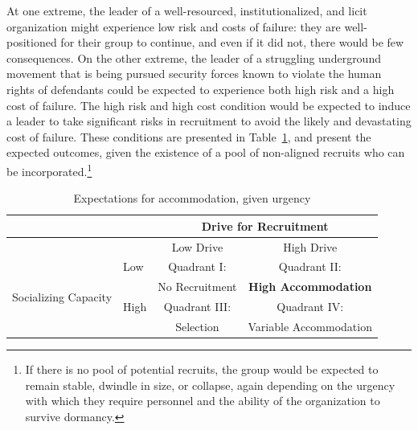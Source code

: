 At one extreme, the leader of a well-resourced, institutionalized, and licit organization might experience low risk and costs of failure: they are well-positioned for their group to continue, and even if it did not, there would be few consequences. On the other extreme, the leader of a struggling underground movement that is being pursued security forces known to violate the human rights of defendants could be expected to experience both high risk and a high cost of failure. The high risk and high cost condition would be expected to induce a leader to take significant risks in recruitment to avoid the likely and devastating cost of failure. These conditions are presented in Table~\ref{tab:preds2}, and present the expected outcomes, given the existence of a pool of non-aligned recruits who can be incorporated.\footnote{If there is no pool of potential recruits, the group would be expected to remain stable, dwindle in size, or collapse, again depending on the urgency with which they require personnel and the ability of the organization to survive dormancy.}

\begin{center}
\begin{table}
\addtolength{\tabcolsep}{4pt} 
\begin{tabular}{p{3.5cm}p{1cm}cc}
&& \multicolumn{2}{c}{Drive for Recruitment}\\
\hline
&& Low Drive & High Drive \\
\hline
\multirow{4}{*}{Socializing Capacity}& Low  &  Quadrant I:   & Quadrant II:\\
&& \vspace{.75mm} No Recruitment \vspace{.5mm} & \vspace{.75mm} \textbf{High Accommodation} \vspace{.5mm}\\
& High & Quadrant III: & Quadrant IV: \\
&&  \vspace{.5mm} Selection \vspace{.5mm} & \vspace{.5mm}Variable Accommodation\vspace{.5mm} \\
\hline
\end{tabular}
\addtolength{\tabcolsep}{1pt} 
\label{tab:preds2}
\caption{Expectations for accommodation, given urgency}
\end{table}
\end{center}

